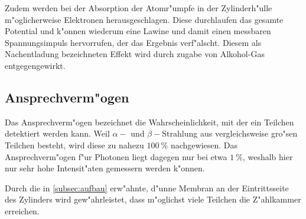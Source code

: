 		Zudem werden bei der Absorption der Atomr"umpfe in der Zylinderh"ulle m"oglicherweise Elektronen herausgeschlagen.
		Diese durchlaufen das gesamte Potential und k"onnen wiederum eine Lawine und damit einen messbaren Spannungsimpuls hervorrufen, der das Ergebnis verf"alscht.
		Diesem als Nachentladung bezeichneten Effekt wird durch zugabe von Alkohol-Gas entgegengewirkt.

	\subsection{Ansprechverm"ogen}
	\label{subsec:ansprechvermoegen}
		Das Ansprechverm"ogen bezeichnet die Wahrscheinlichkeit, mit der ein Teilchen detektiert werden kann.
		Weil $\alpha-$ und $\beta-$Strahlung aus vergleichsweise gro"sen Teilchen besteht, wird diese zu nahezu $\SI{100}{\percent}$ nachgewiesen.
		Das Ansprechverm"ogen f"ur Photonen liegt dagegen nur bei etwa $\SI{1}{\percent}$, weshalb hier nur sehr hohe Intensit"aten gemessern werden k"onnen.

		Durch die in \ref{subsec:aufbau} erw"ahnte, d"unne Membran an der Eintrittsseite des Zylinders wird gew"ahrleistet, dass m"oglichst viele Teilchen die Z"ahlkammer erreichen.